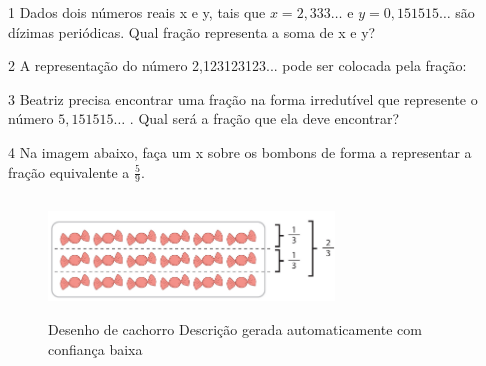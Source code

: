 
\num{1} Dados dois números reais x e y, tais que $x = 2,333\ldots{}$ e $y =
0,151515\ldots{}$ são dízimas periódicas. Qual fração representa a soma de x
e y?


\num{2} A representação do número 2,123123123... pode ser colocada pela
fração:


\num{3} Beatriz precisa encontrar uma fração na forma irredutível que
represente o número $5,151515\ldots{}$ . Qual será a fração que ela deve
encontrar?


\num{4} Na imagem abaixo, faça um x sobre os bombons de forma a
representar a fração equivalente a $\frac{5}{9}$.


\begin{figure}
\centering
\includegraphics[width=2.9871in,height=1.23958in]{./_SAEB_9_MAT/media/image43.png}
\caption{Desenho de cachorro Descrição gerada automaticamente com
confiança baixa}
\end{figure}

